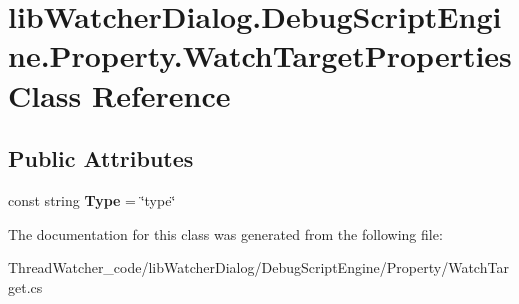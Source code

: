 \hypertarget{classlib_watcher_dialog_1_1_debug_script_engine_1_1_property_1_1_watch_target_properties}{\section{lib\+Watcher\+Dialog.\+Debug\+Script\+Engine.\+Property.\+Watch\+Target\+Properties Class Reference}
\label{classlib_watcher_dialog_1_1_debug_script_engine_1_1_property_1_1_watch_target_properties}
}
\subsection*{Public Attributes}
\begin{DoxyCompactItemize}
\item 
\hypertarget{classlib_watcher_dialog_1_1_debug_script_engine_1_1_property_1_1_watch_target_properties_adb5614b4f0fc3f448406fbfd5109710d}{const string {\bfseries Type} = \char`\"{}type\char`\"{}}\label{classlib_watcher_dialog_1_1_debug_script_engine_1_1_property_1_1_watch_target_properties_adb5614b4f0fc3f448406fbfd5109710d}

\end{DoxyCompactItemize}


The documentation for this class was generated from the following file\+:\begin{DoxyCompactItemize}
\item 
Thread\+Watcher\+\_\+code/lib\+Watcher\+Dialog/\+Debug\+Script\+Engine/\+Property/Watch\+Target.\+cs\end{DoxyCompactItemize}
